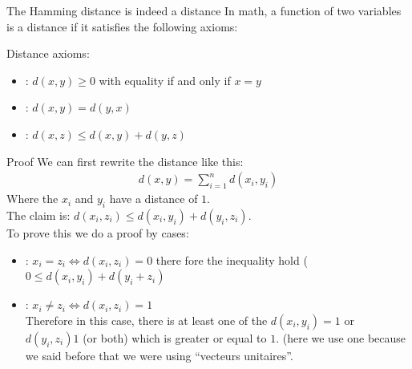 \begin{parag}{The Hamming distance is indeed a distance}
    In math, a function of two variables is a distance if it satisfies the following axioms:
    \begin{definition}
        Distance axioms:
    \begin{itemize}
        \item {}: $d\left(x, y\right) \geq 0$ with equality if and only if $x = y$
        \item {}: $d\left(x, y\right) = d\left(y, x\right)$
        \item {}: $d\left(x, z\right) \leq d\left(x, y\right) + d\left(y, z\right)$
    \end{itemize}
    \end{definition}
    \begin{subparag}{Proof}
        We can first rewrite the distance like this:
        \begin{align*} d\left(x, y\right) = \sum_{i =  1}^{n} d\left(x_i, y_i\right) \end{align*}
        Where the $x_i$ and $y_i$ have a distance of $1$.\\
        The claim is: $d\left(x_i, z_i\right) \leq d\left(x_i, y_i\right) + d\left(y_i, z_i\right)$.\\
        To prove this we do a proof by cases:
       \begin{itemize}
           \item {}: $x_i = z_i \iff d\left(x_i, z_i\right) = 0$ there fore the inequality hold ( $ 0 \leq d\left(x_i, y_i\right) + d\left(y_i + z_i\right)$
           \item {}: $x_i \neq z_i \iff d\left(x_i, z_i\right) = 1$ \\Therefore in this case, there is at least one of the $d\left(x_i, y_i\right) = 1$ or $d\left(y_i, z_i\right)  1$ (or both) which is greater or equal to $1$. (here we use one because we said before that we were using ``vecteurs unitaires''.
       \end{itemize}
        

    \end{subparag}
\end{parag}

